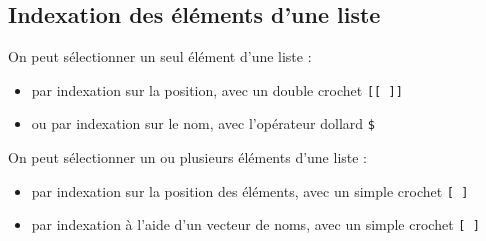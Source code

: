 \documentclass[
]{book}
\providecommand{\tightlist}{%
  \setlength{\itemsep}{0pt}\setlength{\parskip}{0pt}}
\begin{document}
\subsection{Indexation des éléments d'une liste}\label{indexation-des-uxe9luxe9ments-dune-liste}

On peut sélectionner un seul élément d'une liste :

\begin{itemize}
\tightlist
\item
  par indexation sur la position, avec un double crochet \texttt{{[}{[}\ {]}{]}}
\item
  ou par indexation sur le nom, avec l'opérateur dollard \texttt{\$}
\end{itemize}

On peut sélectionner un ou plusieurs éléments d'une liste :

\begin{itemize}
\tightlist
\item
  par indexation sur la position des éléments, avec un simple crochet \texttt{{[}\ {]}}
\item
  par indexation à l'aide d'un vecteur de noms, avec un simple crochet \texttt{{[}\ {]}}
\end{itemize}
\end{document}
